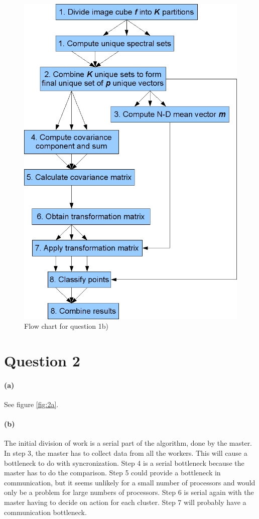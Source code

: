 \documentclass{article}
\begin{document}
\begin{figure}[tp]
\centering
\includegraphics[scale=0.7]{question1_b.png}
\caption{Flow chart for question 1b)}\label{fig:1b}
\end{figure}


\section*{Question 2}

\paragraph{(a)}
See figure \ref{fig:2a}.

\paragraph{(b)}
The initial division of work is a serial part of the algorithm, done by the
master. In step 3, the master has to collect data from all the workers. This
will cause a bottleneck to do with syncronization. Step 4 is a serial
bottleneck because the master has to do the comparison. Step 5 could provide a
bottleneck in communication, but it seems unlikely for a small number of
processors and would only be a problem for large numbers of processors. Step 6
is serial again with the master having to decide on action for each
cluster. Step 7 will probably have a communication bottleneck.
\end{document}
